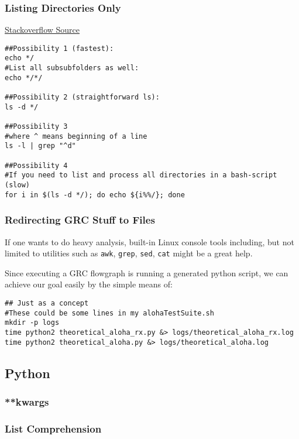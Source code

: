 \documentclass{article}
\begin{document}
\subsubsection{Listing Directories Only}

\href{https://stackoverflow.com/questions/14352290/listing-only-directories-using-ls-in-bash-an-examination}{Stackoverflow Source}

\begin{verbatim}
##Possibility 1 (fastest):
echo */
#List all subsubfolders as well:
echo */*/

##Possibility 2 (straightforward ls):
ls -d */

##Possibility 3
#where ^ means beginning of a line
ls -l | grep "^d"

##Possibility 4
#If you need to list and process all directories in a bash-script (slow)
for i in $(ls -d */); do echo ${i%%/}; done
\end{verbatim}

\subsubsection{Redirecting GRC Stuff to Files}
If one wants to do heavy analysis, built-in Linux console tools including, but not limited to utilities such as \verb|awk|, \verb|grep|, \verb|sed|, \verb|cat| might be a great help.

Since executing a GRC flowgraph is running a generated python script, we can achieve our goal easily by the simple means of:

\begin{verbatim}
## Just as a concept
#These could be some lines in my alohaTestSuite.sh
mkdir -p logs
time python2 theoretical_aloha_rx.py &> logs/theoretical_aloha_rx.log
time python2 theoretical_aloha.py &> logs/theoretical_aloha.log
\end{verbatim}

\subsection{Python}

\subsubsection{**kwargs}

\subsubsection{List Comprehension}
\end{document}

